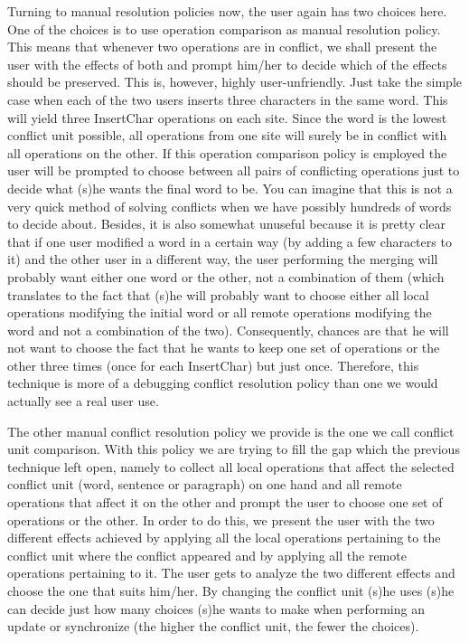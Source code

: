 Turning to manual resolution policies now, the user again has two choices here. One of the choices is
to use operation comparison as manual resolution policy. This means that whenever two operations are in
conflict, we shall present the user with the effects of both and prompt him/her to decide which of the
effects should be preserved. This is, however, highly user-unfriendly. Just take the simple case when
each of the two users inserts three characters in the same word. This will yield three InsertChar operations
on each site. Since the word is the lowest conflict unit possible, all operations from one site will
surely be in conflict with all operations on the other. If this operation comparison policy is employed
the user will be prompted to choose between all pairs of conflicting operations just to decide what (s)he
wants the final word to be. You can imagine that this is not a very quick method of solving conflicts when
we have possibly hundreds of words to decide about. Besides, it is also somewhat unuseful because it is
pretty clear that if one user modified a word in a certain way (by adding a few characters to it) and
the other user in a different way, the user performing the merging will probably want either one word or
the other, not a combination of them (which translates to the fact that (s)he will probably want to choose
either all local operations modifying the initial word or all remote operations modifying the word and not
a combination of the two). Consequently, chances are that he will not want to choose the fact that he wants to keep
one set of operations or the other three times (once for each InsertChar) but just once. Therefore, this
technique is more of a debugging conflict resolution policy than one we would actually see a real user use.

The other manual conflict resolution policy we provide is the one we call conflict unit comparison. With
this policy we are trying to fill the gap which the previous technique left open, namely to collect all
local operations that affect the selected conflict unit (word, sentence or paragraph) on one hand and all
remote operations that affect it on the other and prompt the user to choose one set of operations or the
other. In order to do this, we present the user with the two different effects achieved by applying all
the local operations pertaining to the conflict unit where the conflict appeared and by applying all the
remote operations pertaining to it. The user gets to analyze the two different effects and choose the one
that suits him/her. By changing the conflict unit (s)he uses (s)he can decide just how many choices (s)he
wants to make when performing an update or synchronize (the higher the conflict unit, the fewer the choices).

